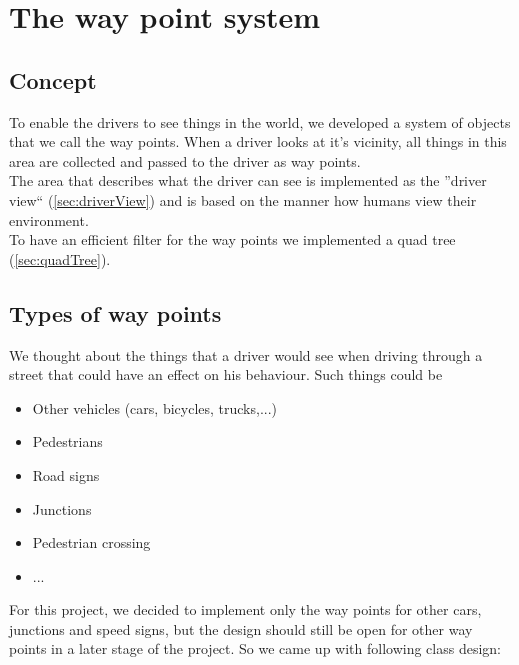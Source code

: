 \section{The way point system}
\label{sec:wayPointSystem}

\subsection{Concept}

To enable the drivers to see things in the world, we developed a system of 
objects that we call the way points. When a driver looks at it's vicinity, all
things in this area are collected and passed to the driver as way points.\\

\noindent The area that describes what the driver can see is implemented as the 
''driver view`` (\ref{sec:driverView}) and is based on the manner 
how humans view their environment. \\

\noindent To have an efficient filter for the way points we implemented a quad tree 
(\ref{sec:quadTree}).

\subsection{Types of way points}

We thought about the things that a driver would see when driving through a 
street that could have an effect on his behaviour. Such things could be

\begin{itemize}
\item Other vehicles (cars, bicycles, trucks,...)
\item Pedestrians
\item Road signs
\item Junctions
\item Pedestrian crossing
\item ...
\end{itemize}

For this project, we decided to implement only the way points for other
cars, junctions and speed signs, but the design should still be open for 
other way points in a later stage of the project. So we came up with following
class design:

